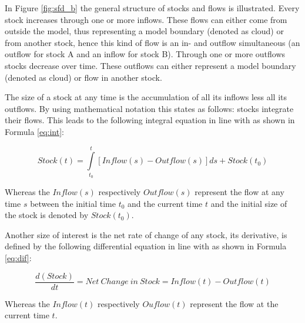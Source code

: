 In Figure \ref{fig:sfd_b} the general structure of stocks and flows is illustrated. Every stock increases through one or more inflows. These flows can either come from outside the model, thus representing a model boundary (denoted as cloud) or from another stock, hence this kind of flow is an in- and outflow simultaneous (an outflow for stock A and an inflow for stock B). Through one or more outflows stocks decrease over time. These outflows can either represent a model boundary (denoted as cloud) or flow in another stock.

The size of a stock at any time is the accumulation of all its inflows less all its outflows. By using mathematical notation this states as follows: stocks integrate their flows. This leads to the following integral equation in line with \citet[p. 194]{Sterman2000} as shown in  Formula \ref{eq:int}:

\begin{equation}\label{eq:int}
		Stock(t) = \int\limits_{t_0}^t [Inflow(s) - Outflow(s)]ds + Stock(t_0)
\end{equation}

Whereas the $Inflow(s)$ respectively $Outflow(s)$ represent the flow at any time $s$ between the initial time $t_0$ and the current time $t$ and the initial size of the stock is denoted by $Stock(t_0)$. 

Another size of interest is the net rate of change of any stock, its derivative, is defined by the following differential equation in line with \citet[p. 194]{Sterman2000} as shown in Formula \ref{eq:dif}:

\begin{equation}\label{eq:dif}
		\frac{d(Stock)}{dt} = \mathit{Net~Change~in~Stock} = Inflow(t) - Outflow(t)
\end{equation}

Whereas the $Inflow(t)$ respectively $Ouflow(t)$ represent the flow at the current time $t$.

